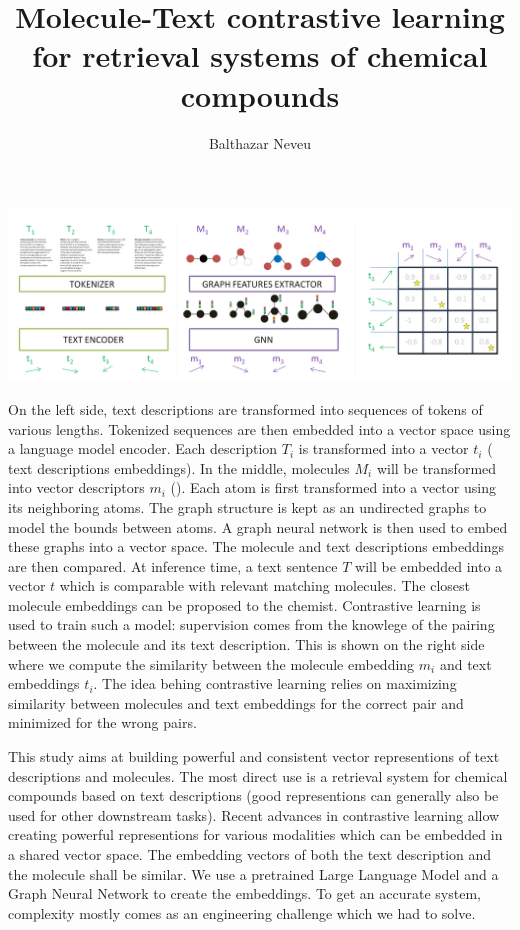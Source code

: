 \documentclass[sigconf, nonacm]{acmart}
\title{Molecule-Text contrastive learning for retrieval systems of chemical compounds}
\author{Balthazar Neveu}
\affiliation{%
  \institution{ENS Paris-Saclay}
  \city{Saclay}
  \country{France}
}
\begin{document}


  \begin{teaserfigure}
    \includegraphics[width=1.\textwidth]{figures/mol_text_overview.PNG}
    \centering
    \caption{On the left side, text descriptions are transformed into sequences of tokens of various lengths. Tokenized sequences are then embedded into a vector space using a language model encoder. Each description $T_{i}$ is transformed into a vector $t_{i}$ (\color{lime} text descriptions embeddings\color{black}). In the middle, molecules $M_{i}$ will be transformed into vector descriptors $m_{i}$ (\color{purple}{molecule embeddings}\color{black}). Each atom is first transformed into a vector using its neighboring atoms. The graph structure is kept as an undirected graphs to model the bounds between atoms. A graph neural network is then used to embed these graphs into a vector space. The molecule and text descriptions embeddings are then compared. At inference time, a text sentence $T$ will be embedded into a vector $t$ which is comparable with relevant matching molecules. The closest molecule embeddings can be proposed to the chemist. Contrastive learning is used to train such a model: supervision comes from the knowlege of the pairing between the molecule and its text description. This is shown on the right side where we compute the similarity between the molecule embedding $m_{i}$ and text embeddings $t_{i}$. The idea behing contrastive learning relies on maximizing similarity between molecules and text embeddings for the correct pair and minimized for the wrong pairs.
    }
    \label{fig:original_pipeline}
  \end{teaserfigure}
  \maketitle



This study aims at building powerful and consistent vector representions of text descriptions and molecules. The most direct use is a retrieval system for chemical compounds based on text descriptions (good representions can generally also be used for other downstream tasks). Recent advances in contrastive learning allow creating powerful representions for various modalities which can be embedded in a shared vector space. The embedding vectors of both the text description and the molecule shall be similar. We use a pretrained Large Language Model and a Graph Neural Network to create the embeddings. To get an accurate system, complexity mostly comes as an engineering challenge which we had to solve. 
\end{document}
